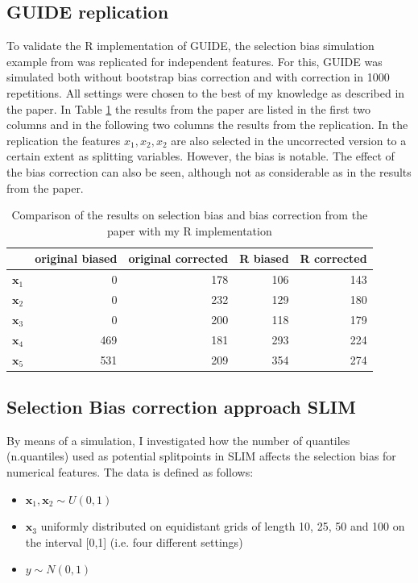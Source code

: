 \subsection{GUIDE replication}
To validate the R implementation of GUIDE, the selection bias simulation example from \citep{Loh.2002} was replicated for independent features. For this, GUIDE was simulated both without bootstrap bias correction and with correction in 1000 repetitions. All settings were chosen to the best of my knowledge as described in the paper. In Table \ref{tab:app_guide_selection_bias} the results from the paper are listed in the first two columns and in the following two columns the results from the replication. In the replication the features $x_1, x_2, x_2$ are also selected in the uncorrected version to a certain extent as splitting variables. However, the bias is notable. The effect of the bias correction can also be seen, although not as considerable as in the results from the paper. 

\begin{table}[!htb]
\centering
\begin{tabular}[t]{l|rr|rr}
\hline
  & original biased & original corrected & R biased & R corrected\\
\hline
$\textbf{x}_1$ & 0 & 178 & 106 & 143\\
$\textbf{x}_2$ & 0 & 232 & 129 & 180\\
$\textbf{x}_3$ & 0 & 200 & 118 & 179\\
$\textbf{x}_4$ & 469 & 181 & 293 & 224\\
$\textbf{x}_5$ & 531 & 209 & 354 & 274\\
\hline
\end{tabular}
\caption{Comparison of the results on selection bias and bias correction from the paper \citep{Loh.2002} with my R implementation}
\label{tab:app_guide_selection_bias}
\end{table}

\subsection{Selection Bias correction approach SLIM} \label{app:selection_bias_correction}

By means of a simulation, I investigated how the number of quantiles (n.quantiles) used as potential splitpoints in SLIM affects the selection bias for numerical features. 
The data is defined as follows:
\begin{itemize}
    \item $\textbf{x}_1, \textbf{x}_2 \sim U(0,1)$
    \item $\textbf{x}_3$ uniformly distributed on equidistant grids of length 10, 25, 50 and 100 on the interval [0,1] (i.e. four different settings)
    \item $y \sim N(0,1)$
\end{itemize}

